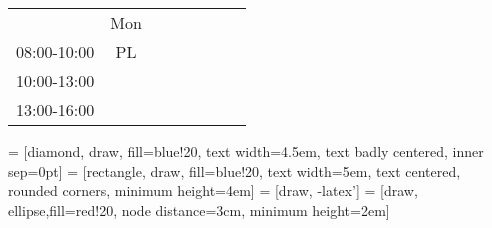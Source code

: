 \begin{table}[!h]
\begin{tabular}{cccccccc}
                                 & Mon                                             &                        &                                                &                        &                                                &                        &                        \\ \cline{2-2}
\multicolumn{1}{c|}{08:00-10:00} & \multicolumn{1}{c|}{\cellcolor[HTML]{FCFF2F}PL} &                        &                                                &                        &                                                &                        &                        \\ \cline{2-2}
\multicolumn{1}{c|}{10:00-13:00} & \multicolumn{1}{c|}{\cellcolor[HTML]{FCFF2F}}   &                        &                                                &                        &                                                &                        &                        \\ \cline{2-2}
\multicolumn{1}{c|}{13:00-16:00} & \multicolumn{1}{c|}{\cellcolor[HTML]{FCFF2F}}   &                        &                                                &                        &                                                &                        &                        \\ \cline{2-2}
\end{tabular}
\end{table}


 = [diamond, draw, fill=blue!20, 
    text width=4.5em, text badly centered, inner sep=0pt]
 = [rectangle, draw, fill=blue!20, 
    text width=5em, text centered, rounded corners, minimum height=4em]
 = [draw, -latex']
 = [draw, ellipse,fill=red!20, node distance=3cm,
    minimum height=2em]

